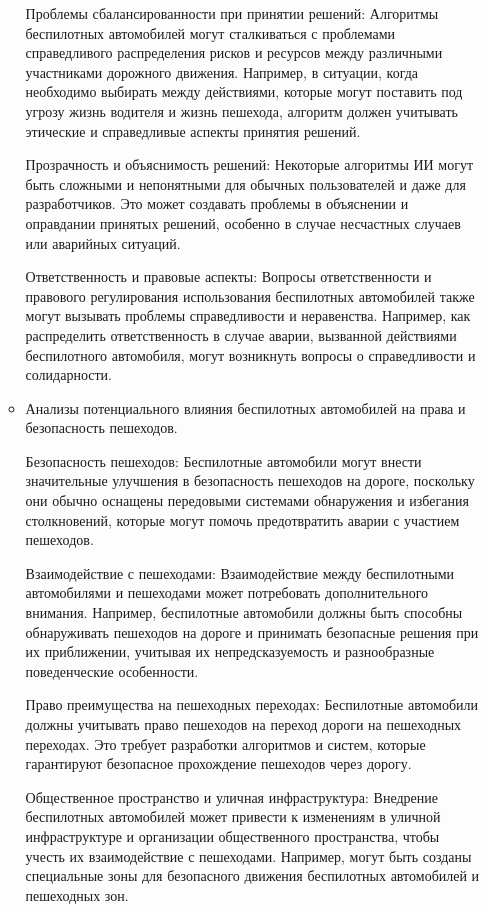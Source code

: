 \documentclass{article}
\begin{document}
\begin{itemize}
\begin{itemize}
        Проблемы сбалансированности при принятии решений: Алгоритмы беспилотных автомобилей могут сталкиваться с проблемами справедливого распределения рисков и ресурсов между различными участниками дорожного движения. Например, в ситуации, когда необходимо выбирать между действиями, которые могут поставить под угрозу жизнь водителя и жизнь пешехода, алгоритм должен учитывать этические и справедливые аспекты принятия решений.

        Прозрачность и объяснимость решений: Некоторые алгоритмы ИИ могут быть сложными и непонятными для обычных пользователей и даже для разработчиков. Это может создавать проблемы в объяснении и оправдании принятых решений, особенно в случае несчастных случаев или аварийных ситуаций.

        Ответственность и правовые аспекты: Вопросы ответственности и правового регулирования использования беспилотных автомобилей также могут вызывать проблемы справедливости и неравенства. Например, как распределить ответственность в случае аварии, вызванной действиями беспилотного автомобиля, могут возникнуть вопросы о справедливости и солидарности.

        \item Анализы потенциального влияния беспилотных автомобилей на права и безопасность пешеходов.

        Безопасность пешеходов: Беспилотные автомобили могут внести значительные улучшения в безопасность пешеходов на дороге, поскольку они обычно оснащены передовыми системами обнаружения и избегания столкновений, которые могут помочь предотвратить аварии с участием пешеходов.

        Взаимодействие с пешеходами: Взаимодействие между беспилотными автомобилями и пешеходами может потребовать дополнительного внимания. Например, беспилотные автомобили должны быть способны обнаруживать пешеходов на дороге и принимать безопасные решения при их приближении, учитывая их непредсказуемость и разнообразные поведенческие особенности.

        Право преимущества на пешеходных переходах: Беспилотные автомобили должны учитывать право пешеходов на переход дороги на пешеходных переходах. Это требует разработки алгоритмов и систем, которые гарантируют безопасное прохождение пешеходов через дорогу.

        Общественное пространство и уличная инфраструктура: Внедрение беспилотных автомобилей может привести к изменениям в уличной инфраструктуре и организации общественного пространства, чтобы учесть их взаимодействие с пешеходами. Например, могут быть созданы специальные зоны для безопасного движения беспилотных автомобилей и пешеходных зон.


\end{itemize}
\end{itemize}
\end{document}
